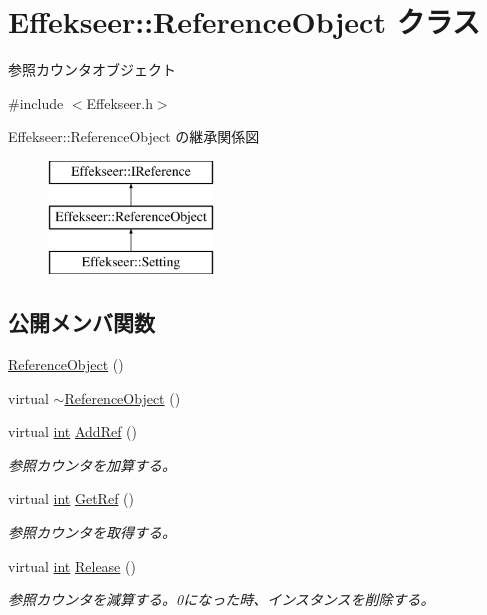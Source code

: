 \hypertarget{class_effekseer_1_1_reference_object}{}\section{Effekseer\+:\+:Reference\+Object クラス}
\label{class_effekseer_1_1_reference_object}


参照カウンタオブジェクト  




{\ttfamily \#include $<$Effekseer.\+h$>$}

Effekseer\+:\+:Reference\+Object の継承関係図\begin{figure}[H]
\begin{center}
\leavevmode
\includegraphics[height=3.000000cm]{class_effekseer_1_1_reference_object}
\end{center}
\end{figure}
\subsection*{公開メンバ関数}
\begin{DoxyCompactItemize}
\item 
\mbox{\hyperlink{class_effekseer_1_1_reference_object_a8754e7232ae958c9e5b0d85f83ce7c3a}{Reference\+Object}} ()
\item 
virtual \mbox{\hyperlink{class_effekseer_1_1_reference_object_a41396f9ecf1d190e4768b134a0c19e26}{$\sim$\+Reference\+Object}} ()
\item 
virtual \mbox{\hyperlink{namespace_effekseer_ace0abf7c2e6947e519ebe8b54cbcc30a}{int}} \mbox{\hyperlink{class_effekseer_1_1_reference_object_a1cc3feeee39b72aea152ed223dbd0fa7}{Add\+Ref}} ()
\begin{DoxyCompactList}\small\item\em 参照カウンタを加算する。 \end{DoxyCompactList}\item 
virtual \mbox{\hyperlink{namespace_effekseer_ace0abf7c2e6947e519ebe8b54cbcc30a}{int}} \mbox{\hyperlink{class_effekseer_1_1_reference_object_a4b8c3d79c58ca527850733691053cf5a}{Get\+Ref}} ()
\begin{DoxyCompactList}\small\item\em 参照カウンタを取得する。 \end{DoxyCompactList}\item 
virtual \mbox{\hyperlink{namespace_effekseer_ace0abf7c2e6947e519ebe8b54cbcc30a}{int}} \mbox{\hyperlink{class_effekseer_1_1_reference_object_a6b0e9aa4d994b557d499b15359b580d8}{Release}} ()
\begin{DoxyCompactList}\small\item\em 参照カウンタを減算する。0になった時、インスタンスを削除する。 \end{DoxyCompactList}\end{DoxyCompactItemize}


